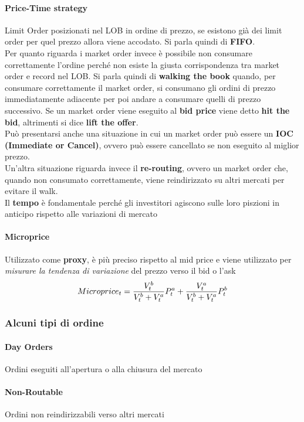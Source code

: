 \documentclass[12pt]{article}
\begin{document}
\paragraph{Price-Time strategy} Limit Order posizionati nel LOB in ordine di prezzo, se esistono già dei limit order per quel prezzo allora viene accodato. Si parla quindi di \textbf{FIFO}.
\\[12pt]Per quanto riguarda i market order invece è possibile non consumare correttamente l'ordine perché non esiste la giusta corrispondenza tra market order e record nel LOB. Si parla quindi di \textbf{walking the book} quando, per consumare correttamente il market order, si consumano gli ordini di prezzo immediatamente adiacente per poi andare a consumare quelli di prezzo successivo. Se un market order viene eseguito al \textbf{bid price} viene detto \textbf{hit the bid}, altrimenti si dice \textbf{lift the offer}.\\[12pt] Può presentarsi anche una situazione in cui un market order può essere un \textbf{IOC (Immediate or Cancel)}, ovvero può essere cancellato se non eseguito al miglior prezzo. \\Un'altra situazione riguarda invece il \textbf{re-routing}, ovvero un market order che, quando non consumato correttamente, viene reindirizzato su altri mercati per evitare il walk.
\\Il \textbf{tempo} è fondamentale perché gli investitori agiscono sulle loro piszioni in anticipo rispetto alle variazioni di mercato
\paragraph{Microprice} Utilizzato come \textbf{proxy}, è più preciso rispetto al mid price e viene utilizzato per \textit{misurare la tendenza di variazione} del prezzo verso il bid o l'ask
$$Microprice_t = {V_t^b \over {V_t^b+V_t^a}}P_t^a + {V_t^a \over {V_t^b+V_t^a}}P_t^b$$
\subsubsection{Alcuni tipi di ordine}
\paragraph{Day Orders} Ordini eseguiti all'apertura o alla chiusura del mercato
\paragraph{Non-Routable} Ordini non reindirizzabili verso altri mercati
\end{document}
